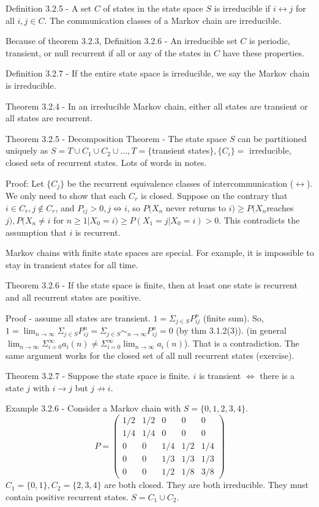 \documentclass{article}
\begin{document}
Definition 3.2.5 - A set $C$ of states in the state space $S$ is irreducible if $i \leftrightarrow j$ for all $i, j \in C$. The communication classes of a Markov chain are irreducible.

Because of theorem 3.2.3, Definition 3.2.6 - An irreducible set $C$ is periodic, transient, or null recurrent if all or any of the states in $C$ have these properties.

Definition 3.2.7 - If the entire state space is irreducible, we say the Markov chain is irreducible.

Theorem 3.2.4 - In an irreducible Markov chain, either all states are transient or all states are recurrent.

Theorem 3.2.5 - Decomposition Theorem - The state space $S$ can be partitioned uniquely as $S = T \cup C_1 \cup C_2 \cup \dots, T = \{$transient states$\}, \{C_i\} =$ irreducible, closed sets of recurrent states. Lots of words in notes.

Proof: Let $\{C_j\}$ be the recurrent equivalence classes of intercommunication ($\leftrightarrow$). We only need to show that each $C_r$ is closed. Suppose on the contrary that $i \in C_r, j \not \in C_r$, and $P_{ij}> 0, j \not \leftrightarrow i$, so $P(X_n$ never returns to $i) \ge P(X_n $reaches $j), P(X_n \ne i$ for $n \ge 1 | X_0=i) \ge P(X_1 = j | X_0 = i) > 0$. This contradicts the assumption that $i$ is recurrent.

Markov chains with finite state spaces are special. For example, it is impossible to stay in transient states for all time.

Theorem 3.2.6 - If the state space is finite, then at least one state is recurrent and all recurrent states are positive.

Proof - assume all states are transient. $1 = \Sigma_{j \in S} P_{ij}^n$ (finite sum). So, $1 = \lim_{n \rightarrow \infty} \Sigma_{j \in S} P_{ij}^n = \Sigma_{j \in S} \sim_{n \rightarrow \infty} P_{ij}^n = 0$ (by thm 3.1.2(3)). (in general $\lim_{n \rightarrow \infty} \Sigma_{i=0}^\infty a_i(n) \ne \Sigma_{i=0}^\infty \lim_{n \rightarrow \infty} a_i(n)$). That is a contradiction. The same argument works for the closed set of all null recurrent states (exercise).

Theorem 3.2.7 - Suppose the state space is finite. $i$ is transient $\iff$ there is a state $j$ with $i \rightarrow j$ but $j \not \rightarrow i$.

Example 3.2.6 - Consider a Markov chain with $S = \{0, 1, 2, 3, 4\}$. \begin{displaymath} P = \left( \begin{array}{ccccc} 1/2 & 1/2 & 0 & 0 & 0 \\ 1/4 & 1/4 & 0 & 0 & 0 \\ 0 & 0 & 1/4 & 1/2 & 1/4 \\ 0 & 0 & 1/3 & 1/3 & 1/3 \\ 0 & 0 & 1/2 & 1/8 & 3/8 \end{array} \right) \end{displaymath} $C_1 = \{0, 1\}, C_2 = \{2, 3, 4\}$ are both closed. They are both irreducible. They must contain positive recurrent states. $S = C_1 \cup C_2$.
\end{document}
